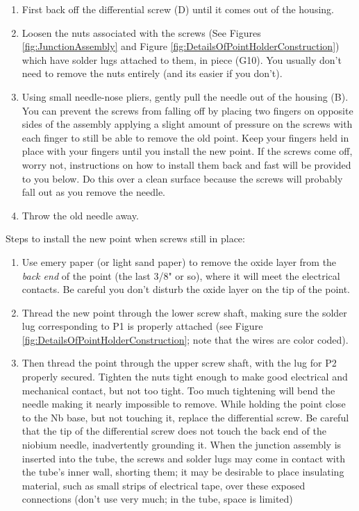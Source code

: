 \documentclass{../lab}
\begin{document}
\begin{enumerate}
    \item First back off the differential screw (D) until it comes out of the housing.

    \item Loosen the nuts associated with the screws (See Figures \ref{fig:JunctionAssembly} and Figure \ref{fig:DetailsOfPointHolderConstruction}) which have solder lugs attached to them, in piece (G10). You usually don't need to remove the nuts entirely (and its easier if you don't).

    \item Using small needle-nose pliers, gently pull the needle out of the housing (B).  You can prevent the screws from falling off by placing two fingers on opposite sides of the assembly applying a slight amount of pressure on the screws with each finger to still be able to remove the old point. Keep your fingers held in place with your fingers until you install the new point. If the screws come off, worry not, instructions on how to install them back and  fast will be provided to you below. Do this over a clean surface because the screws will probably fall out as you remove the needle.

    \item Throw the old needle away.

\end{enumerate}

\noindent Steps to install the new point when screws still in place:

\begin{enumerate}
    \item Use emery paper (or light sand paper) to remove the oxide layer from the \emph{back end }of the point (the last 3/8" or so), where it will meet the electrical contacts. Be careful you don't disturb the oxide layer on the tip of the point.

    \item Thread the new point through the lower screw shaft, making sure the solder lug corresponding to P1 is properly attached (see Figure \ref{fig:DetailsOfPointHolderConstruction}; note that the wires are color coded).

    \item Then thread the point through the upper screw shaft, with the lug for P2 properly secured. Tighten the nuts tight enough to make good electrical and mechanical contact, but not too tight. Too much tightening will bend the needle making it nearly impossible to remove. While holding the point close to the Nb base, but not touching it, replace the differential screw. Be careful that the tip of the differential screw does not touch the back end of the niobium needle, inadvertently grounding it. When the junction assembly is inserted into the tube, the screws and solder lugs may come in contact with the tube's inner wall, shorting them; it may be desirable to place insulating material, such as small strips of electrical tape, over these exposed connections (don't use very much; in the tube, space is limited)

\end{enumerate}
\end{document}
